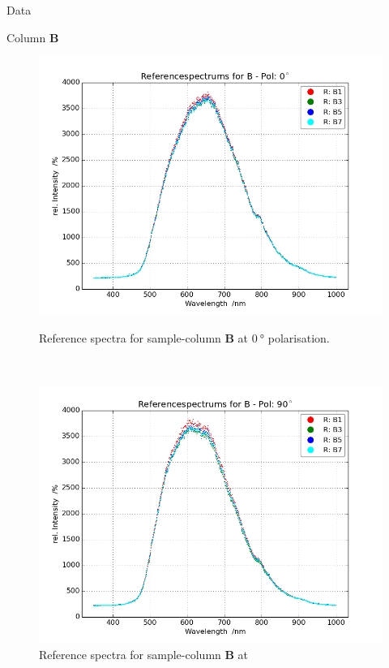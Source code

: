 \begin{appendix}
\begin{chapter}{Data}
\begin{section}{Column \textbf{B}}
      \begin{figure}[ht!]
        \centering
        \begin{minipage}{.92\textwidth}
          \centering
          \includegraphics[width=\textwidth]{Figures/Refspec_BPol0.png}
          \caption{Reference spectra for sample-column \textbf{B} at
              $\SI{0}{\degree}$ polarisation.}
          \label{fig:Refspec_BPol0}
        \end{minipage}\\
        \begin{minipage}{.92\textwidth}
          \centering
          \includegraphics[width=\textwidth]{Figures/Refspec_BPol90.png}
          \caption{Reference spectra for sample-column \textbf{B} at
}
\end{minipage}
\end{figure}
\end{section}
\end{chapter}
\end{appendix}
